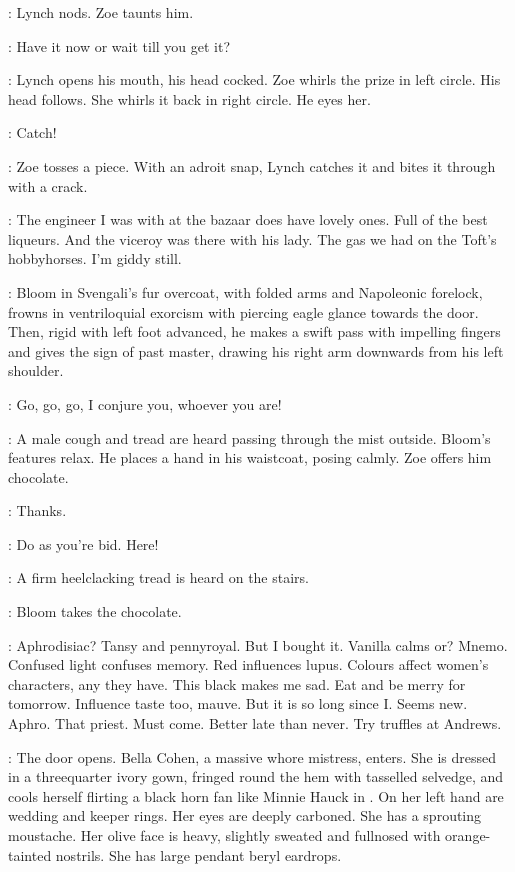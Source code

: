 :
Lynch nods.
Zoe taunts him.

\Zoe:
Have it now or wait till you get it?

:
Lynch opens his mouth, his head cocked.
Zoe whirls the prize in left circle.
His head follows.
She whirls it back in right circle.
He eyes her.

\Zoe:
Catch!

:
Zoe tosses a piece.
With an adroit snap, Lynch catches it and bites it through with a crack.

\Kitty:
The engineer I was with at the bazaar does have lovely ones.
Full of the best liqueurs.
And the viceroy was there with his lady.
The gas we had on the Toft's hobbyhorses.
I'm giddy still.

:
Bloom in Svengali's fur overcoat, with folded arms and Napoleonic forelock,
frowns in ventriloquial exorcism with piercing eagle glance towards the door.
Then, rigid with left foot advanced, he makes a swift pass
with impelling fingers and gives the sign of past master,
drawing his right arm downwards from his left shoulder.

\Bloom:
Go, go, go, I conjure you, whoever you are!

:
A male cough and tread are heard passing through the mist outside.
Bloom's features relax.
He places a hand in his waistcoat, posing calmly.
Zoe offers him chocolate.

\Bloom:
Thanks.

\Zoe:
Do as you're bid.
Here!

:
A firm heelclacking tread is heard on the stairs.

:
Bloom takes the chocolate.

\Bloom:
Aphrodisiac?
Tansy and pennyroyal.
But I bought it.
Vanilla calms or?
Mnemo.
Confused light confuses memory.
Red influences lupus.
Colours affect women's characters, any they have.
This black makes me sad.
Eat and be merry for tomorrow.
Influence taste too, mauve.
But it is so long since I.
Seems new.
Aphro.
That priest.
Must come.
Better late than never.
Try truffles at Andrews.

:
The door opens.
Bella Cohen, a massive whore mistress, enters.
She is dressed in a threequarter ivory gown,
fringed round the hem with tasselled selvedge,
and cools herself flirting a black horn fan like Minnie Hauck in .
On her left hand are wedding and keeper rings.
Her eyes are deeply carboned.
She has a sprouting moustache.
Her olive face is heavy, slightly sweated and fullnosed with orange-tainted nostrils.
She has large pendant beryl eardrops.

